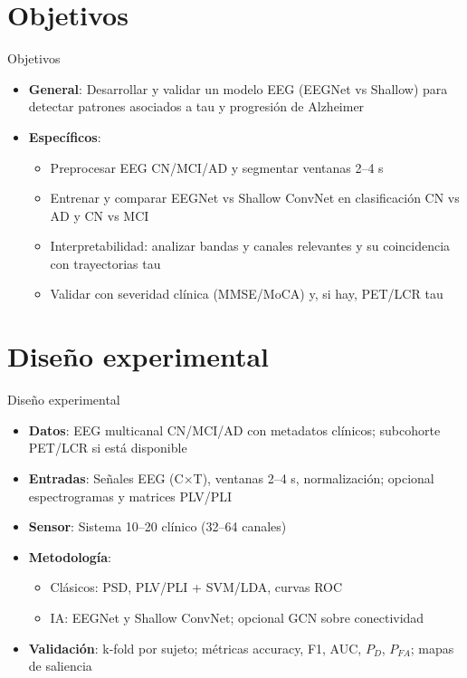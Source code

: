 \documentclass{beamer}
\begin{document}
\section{Objetivos}
\begin{frame}{Objetivos}
\begin{itemize}
  \item \textbf{General}: Desarrollar y validar un modelo EEG (EEGNet vs Shallow) para detectar patrones asociados a tau y progresión de Alzheimer \cite{Lawhern2018,Schirrmeister2017}
  \item \textbf{Específicos}:
    \begin{itemize}
      \item Preprocesar EEG CN/MCI/AD y segmentar ventanas 2–4 s \cite{Schirrmeister2017}
      \item Entrenar y comparar EEGNet vs Shallow ConvNet en clasificación CN vs AD y CN vs MCI \cite{Lawhern2018}
      \item Interpretabilidad: analizar bandas y canales relevantes y su coincidencia con trayectorias tau \cite{Ajra2023}
      \item Validar con severidad clínica (MMSE/MoCA) y, si hay, PET/LCR tau \cite{dePaula2009}
    \end{itemize}
\end{itemize}
\end{frame}


\section{Diseño experimental}
\begin{frame}{Diseño experimental}
\begin{itemize}
  \item \textbf{Datos}: EEG multicanal CN/MCI/AD con metadatos clínicos; subcohorte PET/LCR si está disponible \cite{Ajra2023}
  \item \textbf{Entradas}: Señales EEG (C×T), ventanas 2–4 s, normalización; opcional espectrogramas y matrices PLV/PLI \cite{Lawhern2018,Schirrmeister2017}
  \item \textbf{Sensor}: Sistema 10–20 clínico (32–64 canales) \cite{Schirrmeister2017}
  \item \textbf{Metodología}:
    \begin{itemize}
      \item Clásicos: PSD, PLV/PLI + SVM/LDA, curvas ROC \cite{Kay1998}
      \item IA: EEGNet y Shallow ConvNet; opcional GCN sobre conectividad \cite{Lawhern2018,Ajra2023}
    \end{itemize}
  \item \textbf{Validación}: k-fold por sujeto; métricas accuracy, F1, AUC, \(P_D\), \(P_{FA}\); mapas de saliencia \cite{Kay1998,Lawhern2018}
\end{itemize}
\end{frame}
\end{document}
